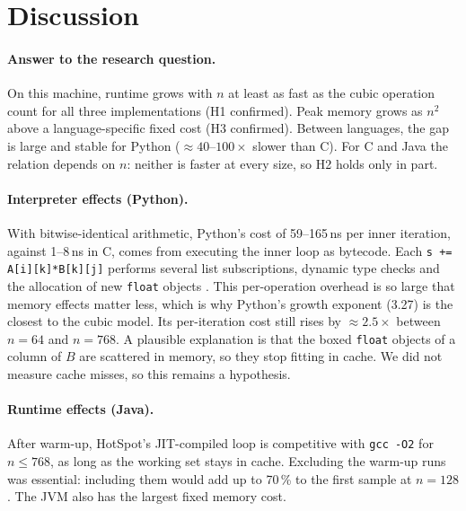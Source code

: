 \documentclass[10pt,a4paper]{article}
\begin{document}
\section{Discussion}
\paragraph{Answer to the research question.} On this machine, runtime grows with $n$ at least
as fast as the cubic operation count for all three implementations (H1 confirmed). Peak memory
grows as $n^2$ above a language-specific fixed cost (H3 confirmed). Between languages, the gap
is large and stable for Python ($\approx40$--$100\times$ slower than C). For C and Java the
relation depends on $n$: neither is faster at every size, so H2 holds only in part.

\paragraph{Interpreter effects (Python).} With bitwise-identical arithmetic, Python's cost of
59--165\,ns per inner iteration, against 1--8\,ns in C, comes from executing the inner loop as
bytecode. Each \texttt{s += A[i][k]*B[k][j]} performs several list subscriptions, dynamic type
checks and the allocation of new \texttt{float} objects \cite{pythondatamodel}. This
per-operation overhead is so large that memory effects matter less, which is why Python's growth
exponent (3.27) is the closest to the cubic model. Its per-iteration cost still rises by
$\approx2.5\times$ between $n=64$ and $n=768$. A plausible explanation is that the boxed
\texttt{float} objects of a column of $B$ are scattered in memory, so they stop fitting in cache.
We did not measure cache misses, so this remains a hypothesis.

\paragraph{Runtime effects (Java).} After warm-up, HotSpot's JIT-compiled loop is competitive
with \texttt{gcc -O2} for $n\le768$, as long as the working set stays in cache. Excluding the
warm-up runs was essential: including them would add up to 70\,\% to the first sample at
$n=128$ \cite{georges2007}. The JVM also has the largest fixed memory cost.
\end{document}
